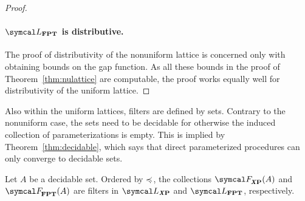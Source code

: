 \begin{proof}
  \paragraph{$\calL_\cl{FPT}$ is distributive.}
  The proof of distributivity of the nonuniform lattice is concerned only with obtaining bounds on the gap function.
  As all these bounds in the proof of Theorem~\ref{thm:nulattice} are computable, the proof works equally well for distributivity of the uniform lattice.
\end{proof}

Also within the uniform lattices, filters are defined by sets.
Contrary to the nonuniform case, the sets need to be decidable for otherwise the induced collection of parameterizations is empty.
This is implied by Theorem~\ref{thm:decidable}, which says that direct parameterized procedures can only converge to decidable sets.
\begin{theorem}
\label{thm:filter}%
  Let $A$ be a decidable set.
  Ordered by $\preccurlyeq$, the collections $\calF_\clX{P}(A)$ and $\calF_\cl{FPT}(A)$ are filters in $\calL_\clX{P}$ and $\calL_\cl{FPT}$, respectively.
\end{theorem}
